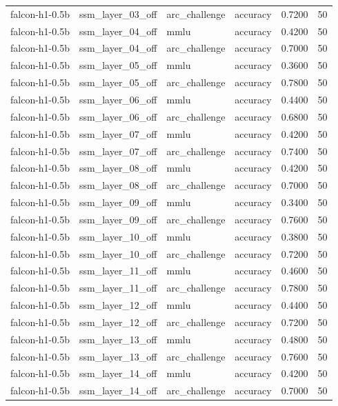 \begin{tabular}{llllrr}
falcon-h1-0.5b & ssm_layer_03_off & arc_challenge & accuracy & 0.7200 & 50 \\
falcon-h1-0.5b & ssm_layer_04_off & mmlu & accuracy & 0.4200 & 50 \\
falcon-h1-0.5b & ssm_layer_04_off & arc_challenge & accuracy & 0.7000 & 50 \\
falcon-h1-0.5b & ssm_layer_05_off & mmlu & accuracy & 0.3600 & 50 \\
falcon-h1-0.5b & ssm_layer_05_off & arc_challenge & accuracy & 0.7800 & 50 \\
falcon-h1-0.5b & ssm_layer_06_off & mmlu & accuracy & 0.4400 & 50 \\
falcon-h1-0.5b & ssm_layer_06_off & arc_challenge & accuracy & 0.6800 & 50 \\
falcon-h1-0.5b & ssm_layer_07_off & mmlu & accuracy & 0.4200 & 50 \\
falcon-h1-0.5b & ssm_layer_07_off & arc_challenge & accuracy & 0.7400 & 50 \\
falcon-h1-0.5b & ssm_layer_08_off & mmlu & accuracy & 0.4200 & 50 \\
falcon-h1-0.5b & ssm_layer_08_off & arc_challenge & accuracy & 0.7000 & 50 \\
falcon-h1-0.5b & ssm_layer_09_off & mmlu & accuracy & 0.3400 & 50 \\
falcon-h1-0.5b & ssm_layer_09_off & arc_challenge & accuracy & 0.7600 & 50 \\
falcon-h1-0.5b & ssm_layer_10_off & mmlu & accuracy & 0.3800 & 50 \\
falcon-h1-0.5b & ssm_layer_10_off & arc_challenge & accuracy & 0.7200 & 50 \\
falcon-h1-0.5b & ssm_layer_11_off & mmlu & accuracy & 0.4600 & 50 \\
falcon-h1-0.5b & ssm_layer_11_off & arc_challenge & accuracy & 0.7800 & 50 \\
falcon-h1-0.5b & ssm_layer_12_off & mmlu & accuracy & 0.4400 & 50 \\
falcon-h1-0.5b & ssm_layer_12_off & arc_challenge & accuracy & 0.7200 & 50 \\
falcon-h1-0.5b & ssm_layer_13_off & mmlu & accuracy & 0.4800 & 50 \\
falcon-h1-0.5b & ssm_layer_13_off & arc_challenge & accuracy & 0.7600 & 50 \\
falcon-h1-0.5b & ssm_layer_14_off & mmlu & accuracy & 0.4200 & 50 \\
falcon-h1-0.5b & ssm_layer_14_off & arc_challenge & accuracy & 0.7000 & 50 \\

\end{tabular}
